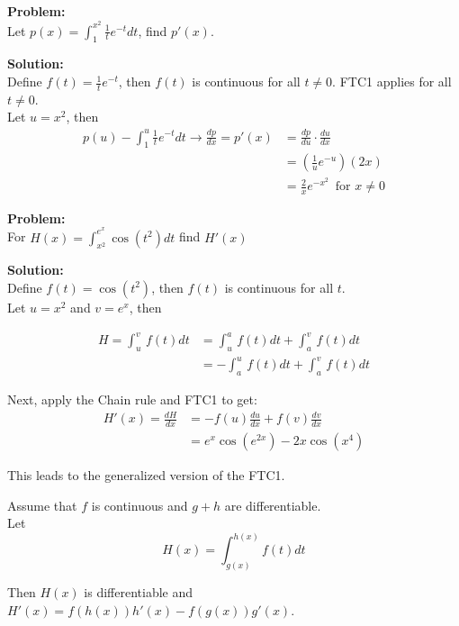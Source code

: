 \documentclass[11pt]{article}
\theoremstyle{plain}
\theoremstyle{remark}
\theoremstyle{plain}
\newcommand{\bd}{\textbf}
\begin{document}
\begin{tcolorbox}[colback=magenta!5!white,colframe=magenta!75!black,title=Example]
    \bd{Problem:} \\Let $p(x) = \int_1^{x^2}\frac{1}{t}e^{-t}dt$, find $p'(x)$.

    \bd{Solution:} \\
    Define $f(t) = \frac{1}{t}e^{-t}$, then $f(t)$ is continuous for all $t\neq 0$. FTC1 applies for all $t\neq 0$.\\

    Let $u=x^2$, then 
    \begin{align*}
        p(u) - \int_1^u\frac{1}{t}e^{-t}dt\rightarrow \frac{dp}{dx} = p'(x) &= \frac{dp}{du}\cdot \frac{du}{dx} \\
        &=(\frac{1}{u}e^{-u})(2x) \\
        &=\frac{2}{x}e^{-x^2}\,\text{ for $x\neq 0$}
    \end{align*}
\end{tcolorbox}   

\begin{tcolorbox}[colback=magenta!5!white,colframe=magenta!75!black,title=Example]
    \bd{Problem:} \\For $H(x) = \int_{x^2}^{e^x}\cos(t^2)dt$ find $H'(x)$

    \bd{Solution:} \\
    Define $f(t) = \cos(t^2)$, then $f(t)$ is continuous for all $t$. \\

    Let $u=x^2$ and $v=e^x$, then

    \begin{align*}
        H = \int_u^v\,f(t)dt &= \int_u^a\,f(t)dt + \int_a^v\,f(t)dt \\
        &=-\int_a^u\,f(t)dt + \int_a^v\,f(t)dt
    \end{align*}

    Next, apply the Chain rule and FTC1 to get:
    \begin{align*}
        H'(x) = \frac{dH}{dx} &= -f(u)\frac{du}{dx} + f(v)\frac{dv}{dx} \\
        &= e^x\cos(e^{2x})-2x\cos(x^4) 
    \end{align*}

    This leads to the generalized version of the FTC1.
\end{tcolorbox}   

\begin{tcolorbox}[colback=green!5!white,colframe=green!75!black,title=Definition: FTC1 - Extended Version]
    Assume that $f$ is continuous and $g+h$ are differentiable. \\

    Let \[H(x) = \int_{g(x)}^{h(x)}f(t)dt\]

    Then $H(x)$ is differentiable and $H'(x) = f(h(x))h'(x)-f(g(x))g'(x)$.
\end{tcolorbox}   
\end{document}
